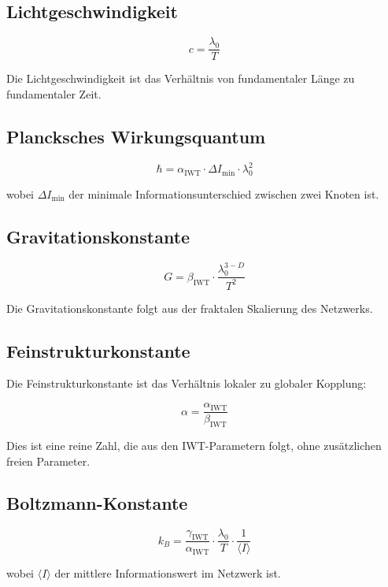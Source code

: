 \subsection{Lichtgeschwindigkeit}
\label{sub:c_relation}

\[
c = \frac{\lambda_0}{T}
\]

Die Lichtgeschwindigkeit ist das Verhältnis von fundamentaler Länge zu fundamentaler Zeit.

\subsection{Plancksches Wirkungsquantum}
\label{sub:h_relation}

\[
\hbar = \alpha_{\text{IWT}} \cdot \Delta I_{\min} \cdot \lambda_0^2
\]

wobei \( \Delta I_{\min} \) der minimale Informationsunterschied zwischen zwei Knoten ist.

\subsection{Gravitationskonstante}
\label{sub:g_relation}

\[
G = \beta_{\text{IWT}} \cdot \frac{\lambda_0^{3-D}}{T^2}
\]

Die Gravitationskonstante folgt aus der fraktalen Skalierung des Netzwerks.

\subsection{Feinstrukturkonstante}
\label{sub:alpha_relation}

Die Feinstrukturkonstante ist das Verhältnis lokaler zu globaler Kopplung:

\[
\alpha = \frac{\alpha_{\text{IWT}}}{\beta_{\text{IWT}}}
\]

Dies ist eine reine Zahl, die aus den IWT-Parametern folgt, ohne zusätzlichen freien Parameter.

\subsection{Boltzmann-Konstante}
\label{sub:k_relation}

\[
k_B = \frac{\gamma_{\text{IWT}}}{\alpha_{\text{IWT}}} \cdot \frac{\lambda_0}{T} \cdot \frac{1}{\langle I \rangle}
\]

wobei \( \langle I \rangle \) der mittlere Informationswert im Netzwerk ist.

